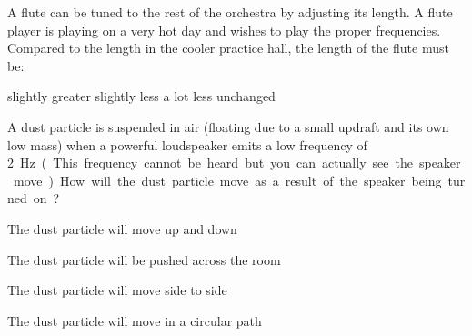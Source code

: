 \documentclass{../oss-apphys-exam}
\begin{document}
\begin{questions}
  \question A flute can be tuned to the rest of the orchestra by adjusting its
  length. A flute player is playing on a very hot day and wishes to play the
  proper frequencies. Compared to the length in the cooler practice hall, the
  length of the flute must be:
  \begin{choices}
    \choice slightly greater
    \choice slightly less
    \choice a lot less
    \choice unchanged
  \end{choices}

  \question A dust particle is suspended in air (floating due to a small updraft
  and its own low mass) when a powerful loudspeaker emits a low frequency
  of \SI{2}\hertz. (This frequency cannot be heard but you can actually see
  the speaker move). How will the dust particle move as a result of the speaker
  being turned on?
  
  \begin{minipage}{.6\textwidth}
    \begin{choices}
    \item The dust particle will move up and down
    \item The dust particle will be pushed across the room
    \item The dust particle will move side to side
    \item The dust particle will move in a circular path
    \end{choices}
  \end{minipage}
  \begin{minipage}{.3\textwidth}
    \begin{center}
    \end{center}
  \end{minipage}
  

\end{questions}
\end{document}

